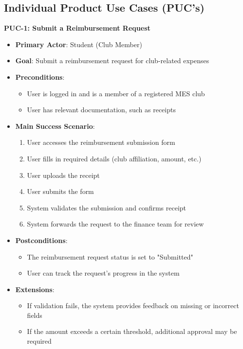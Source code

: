 \documentclass[12pt]{article}
\begin{document}
\subsection{Individual Product Use Cases (PUC's)}
\textbf{PUC-1: Submit a Reimbursement Request}
\begin{itemize}
    \item \textbf{Primary Actor}: Student (Club Member)
    \item \textbf{Goal}: Submit a reimbursement request for club-related expenses
    \item \textbf{Preconditions}:
    \begin{itemize}
        \item User is logged in and is a member of a registered MES club
        \item User has relevant documentation, such as receipts
    \end{itemize}
    \item \textbf{Main Success Scenario}:
    \begin{enumerate}
        \item User accesses the reimbursement submission form
        \item User fills in required details (club affiliation, amount, etc.)
        \item User uploads the receipt
        \item User submits the form
        \item System validates the submission and confirms receipt
        \item System forwards the request to the finance team for review
    \end{enumerate}
    \item \textbf{Postconditions}:
    \begin{itemize}
        \item The reimbursement request status is set to "Submitted"
        \item User can track the request's progress in the system
    \end{itemize}
    \item \textbf{Extensions}:
    \begin{itemize}
        \item If validation fails, the system provides feedback on missing or incorrect fields
        \item If the amount exceeds a certain threshold, additional approval may be required
    \end{itemize}


\end{itemize}
\end{document}
